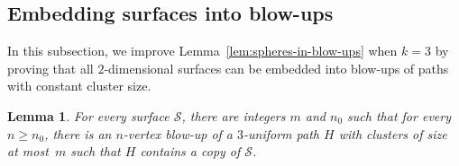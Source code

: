 \documentclass[12pt,reqno]{amsart}
\theoremstyle{plain}
\newtheorem{lemma}[theorem]{Lemma}
\theoremstyle{definition}
\numberwithin{equation}{section}
\newcommand{\cS}{\mathcal{S}}
\begin{document}
    
	\subsection{Embedding surfaces into blow-ups}\label{sec:surfaces-proof}
	
	In this subsection, we improve Lemma~\ref{lem:spheres-in-blow-ups} when $k=3$ by proving that all $2$-dimensional surfaces can be embedded into blow-ups of paths with constant cluster size.
	
	\begin{lemma}\label{lem:surfaces-in-blow-ups}
		For every surface $\cS$, there are integers $m$ and $n_0$ such that for every $n\geq n_0$, there is an $n$-vertex blow-up of a $3$-uniform path $H$ with clusters of size at most~$m$ such that $H$ contains a copy of $\cS$.
	\end{lemma}
	
\end{document}
